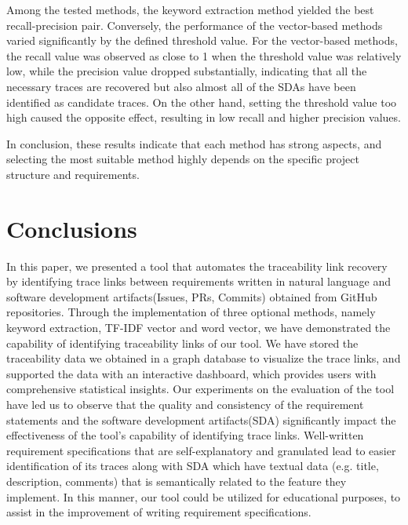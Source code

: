 \documentclass[conference]{IEEEtran}
\begin{document}
Among the tested methods, the keyword extraction method yielded the best recall-precision pair. Conversely, the performance of the vector-based methods varied significantly by the defined threshold value. For the vector-based methods, the recall value was observed as close to 1 when the threshold value was relatively low, while the precision value dropped substantially, indicating that all the necessary traces are recovered but also almost all of the SDAs have been identified as candidate traces. On the other hand, setting the threshold value too high caused the opposite effect, resulting in low recall and higher precision values. 

In conclusion, these results indicate that each method has strong aspects, and selecting the most suitable method highly depends on the specific project structure and requirements. 



\section{Conclusions}\label{section:conclusion}


In this paper, we presented a tool that automates the traceability link recovery by identifying trace links between requirements written in natural language and software development artifacts(Issues, PRs, Commits) obtained from GitHub repositories. Through the implementation of three optional methods, namely keyword extraction, TF-IDF vector and word vector, we have demonstrated the capability of identifying traceability links of our tool. We have stored the traceability data we obtained in a graph database to visualize the trace links, and supported the data with an interactive dashboard, which provides users with comprehensive statistical insights.
Our experiments on the evaluation of the tool have led us to observe that the quality and consistency of the requirement statements and the software development artifacts(SDA) significantly impact the effectiveness of the tool's capability of identifying trace links. Well-written requirement specifications that are self-explanatory and granulated lead to easier identification of its traces along with SDA which have textual data (e.g. title, description, comments) that is semantically related to the feature they implement. In this manner, our tool could be utilized for educational purposes, to assist in the improvement of writing requirement specifications.
\end{document}

